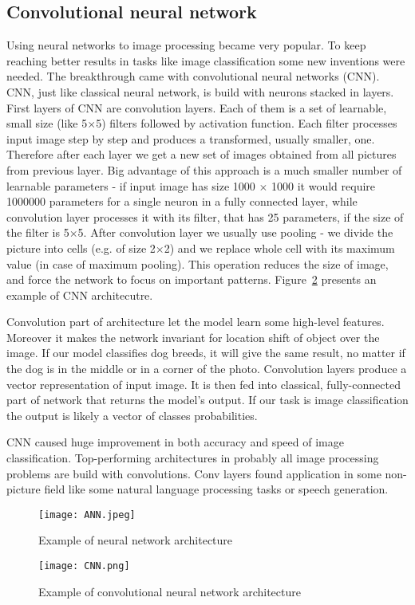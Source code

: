 \documentclass{article}
\begin{document}
\subsection{Convolutional neural network}
Using neural networks to image processing became very popular. To keep reaching better results in tasks like image classification some new inventions were needed. The breakthrough came with convolutional neural networks (CNN). CNN, just like classical neural network, is build with neurons stacked in layers. First layers of CNN are convolution layers. Each of them is a set of learnable, small size (like 5$\times$5) filters followed by activation function. Each filter processes input image step by step and produces a transformed, usually smaller, one. Therefore after each layer we get a new set of images obtained from all pictures from previous layer. Big advantage of this approach is a much smaller number of learnable parameters - if input image has size 1000 $\times$ 1000 it would require 1000000 parameters for a single neuron in a fully connected layer, while convolution layer processes it with its filter, that has 25 parameters, if the size of the filter is 5$\times$5.  After convolution layer we usually use pooling - we divide the picture into cells (e.g. of size 2$\times$2) and we replace whole cell with its maximum value (in case of maximum pooling). This operation reduces the size of image, and force the network to focus on important patterns. Figure~\ref{fig:CNN} presents an example of CNN architecutre.
\par
Convolution part of architecture let the model learn some high-level features. Moreover it makes the network invariant for location shift of object over the image. If our model classifies dog breeds, it will give the same result, no matter if the dog is in the middle or in a corner of the photo. Convolution layers produce a vector representation of input image. It is then fed into classical, fully-connected part of network that returns the model's output. If our task is image classification the output is likely a vector of classes probabilities.
\par
CNN caused huge improvement in both accuracy and speed of image classification. Top-performing architectures in probably all image processing problems are build with convolutions. Conv layers found application in some non-picture field like some natural language processing tasks or speech generation. 

\begin{figure}[htb]%
    \centering
    \texttt{[image: ANN.jpeg]}%
    \caption{Example of neural network architecture}%
    \label{fig:ANN}%
\end{figure}
\begin{figure}[htb]%
    \centering
    \texttt{[image: CNN.png]}%
    \caption{Example of convolutional neural network architecture}%
    \label{fig:CNN}%
\end{figure}
\end{document}

